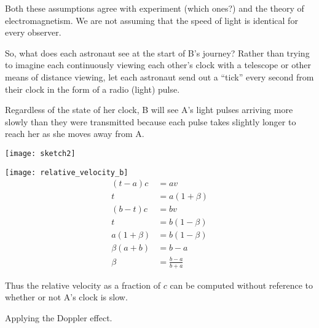 \documentclass{report}
\begin{document}
Both these assumptions agree with experiment (which ones?) and the theory of electromagnetism. We are not assuming that the speed of light is identical for every observer.



So, what does each astronaut see at the start of B's journey? Rather than trying to imagine each continuously viewing each other's clock with a telescope or other means of distance viewing, let each astronaut send out a ``tick'' every second from their clock in the form of a radio (light) pulse.

Regardless of the state of her clock, B will see A's light pulses arriving more slowly than they were transmitted because each pulse takes slightly longer to reach her as she moves away from A.

\texttt{[image: sketch2]}


\texttt{[image: relative\_velocity\_b]}
\begin{align*}
  (t - a) c & =  av \\
  t & = a(1 + \beta) \\
(b - t)c & =  bv \\
t & = b(1 - \beta) \\
a(1 + \beta) & = b(1 - \beta) \\
\beta(a + b) & = b - a \\
\beta & = \frac{b - a}{b + a} 
\end{align*}

Thus the relative velocity as a fraction of $c$ can be computed without reference to whether or not A's clock is slow.


Applying the Doppler effect.

\end{document}
